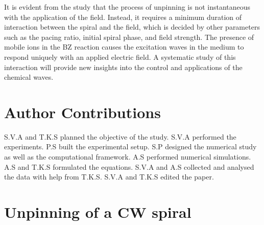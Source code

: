 \documentclass[%
 preprint,
 amsmath,amssymb,
 aps,
]{revtex4-2}
\begin{document}
It is evident from the study that the process of unpinning is not instantaneous with the application of the field. Instead, it requires a minimum duration of interaction between the spiral and the field, which is decided by other parameters such as the pacing ratio, initial spiral phase, and field strength.
The presence of mobile ions in the BZ reaction causes the excitation waves in the medium to respond uniquely with an applied electric field. A systematic study of this interaction will provide new insights into the control and applications of the chemical waves.



\begin{acknowledgments}

\end{acknowledgments}

\section{Author Contributions}
S.V.A and T.K.S planned the objective of the study. S.V.A performed the experiments. P.S built the experimental setup. S.P designed the numerical study as well as the computational framework. A.S performed numerical simulations. A.S and T.K.S formulated the equations. S.V.A and A.S collected and analysed the data with help from T.K.S. S.V.A and T.K.S edited the paper. 


\appendix
\iffalse
\section{Unpinning of a CW spiral}
\end{document}
